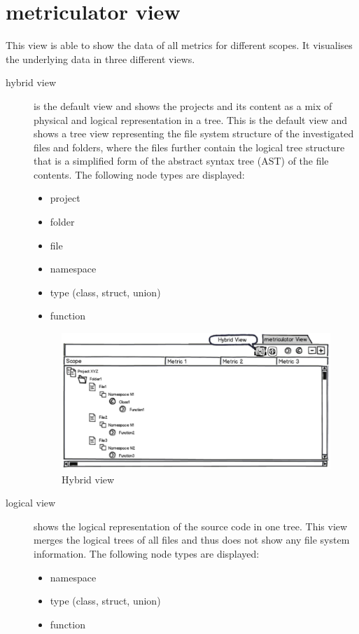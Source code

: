 \documentclass[11pt,a4paper,oneside]{scrreprt}
\begin{document}
\section{metriculator view}\label{metriculator-view}
This view is able to show the data of all metrics for different scopes. It visualises the underlying data in three different views.

\begin{description}
\item[hybrid view] is the default view and shows the projects and its content as a mix of physical and logical representation in a tree. This is the default view and shows a tree view representing the file system structure of the investigated files and folders, where the files further contain the logical tree structure that is a simplified form of the abstract syntax tree (AST) of the file contents. The following node types are displayed:

\begin{itemize}
\item project
\item folder
\item file
\item namespace
\item type (class, struct, union)
\item function
\end{itemize}
\begin{figure}[hp]
 \centering
	 \includegraphics[scale=0.5]{figures/HybridView.png}
 \caption{Hybrid view}
   \label{fig:hybrid_view}
\end{figure}

\item[logical view] shows the logical representation of the source code in one tree. This view merges the logical trees of all files and thus does not show any file system information. The following node types are displayed:
\begin{itemize}
\item namespace
\item type (class, struct, union)
\item function
\end{itemize}


\end{description}
\end{document}
